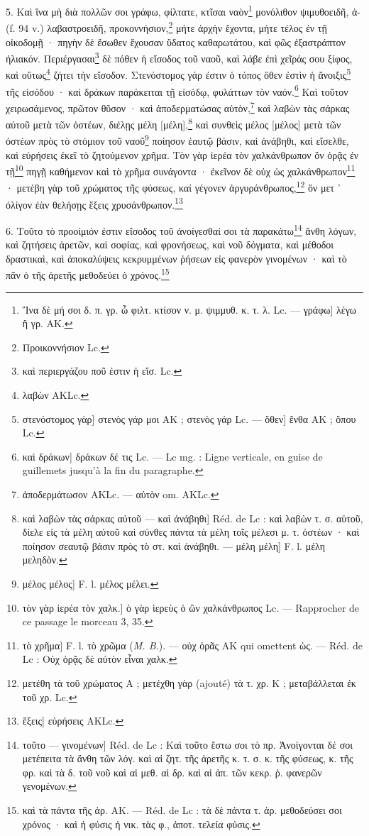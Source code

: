 \documentclass[a4paper, 11pt, oneside, polutonikogreek, french]{article}
\begin{document}
5. Καὶ ἵνα μὴ διὰ πολλῶν σοι γράφω, φίλτατε, κτῖσαι ναὸν\footnote{Ἵνα δὲ μή σοι δ. π. γρ. ὦ φιλτ. κτίσον ν. μ. ψιμμυθ. κ. τ. λ. Lc. --- γράφω] λέγω ἢ γρ. AK.} μονόλιθον ψιμυθοειδῆ, ἀ- (f. 94 v.) λαβαστροειδῆ, προκοννήσιον,\footnote{Προικοννήσιον Lc.} μήτε ἀρχὴν ἔχοντα, μήτε τέλος ἐν τῇ οἰκοδομῇ · πηγὴν δὲ ἔσωθεν ἔχουσαν ὕδατος καθαρωτάτου, καὶ φῶς ἐξαστράπτον ἡλιακόν. Περιέργασαι\footnote{καὶ περιεργάζου ποῦ ἐστιν ἡ εἴσ. Lc.} δὲ πόθεν ἡ εἴσοδος τοῦ ναοῦ, καὶ λάβε ἐπὶ χεῖράς σου ξίφος, καὶ οὕτως\footnote{λαβὼν AKLc.} ζήτει τὴν εἴσοδον. Στενόστομος γάρ ἐστιν ὁ τόπος ὅθεν ἐστὶν ἡ ἄνοιξις\footnote{στενόστομος γὰρ] στενὸς γάρ μοι AK ; στενὸς γάρ Lc. --- ὅθεν] ἔνθα AK ; ὅπου Lc.} τῆς εἰσόδου · καὶ δράκων παράκειται τῇ εἰσόδῳ, φυλάττων τὸν ναόν.\footnote{καὶ δράκων] δράκων δέ τις Lc. --- Lc mg. : Ligne verticale, en guise de guillemets jusqu'à la fin du paragraphe.} Καὶ τοῦτον χειρωσάμενος, πρῶτον θῦσον · καὶ ἀποδερματώσας αὐτὸν,\footnote{ἀποδερμάτωσον AKLc. --- αὐτὸν om. AKLc.} καὶ λαβὼν τὰς σάρκας αὐτοῦ μετὰ τῶν ὀστέων, διέλῃς μέλη [μέλη],\footnote{καὶ λαβὼν τὰς σάρκας αὐτοῦ --- καὶ ἀνάβηθι] Réd. de Lc : καὶ λαβὼν τ. σ. αὐτοῦ, δίελε εἰς τὰ μέλη αὐτοῦ καὶ σύνθες πάντα τὰ μέλη τοῖς μέλεσι μ. τ. ὀστέων · καὶ ποίησον σεαυτῷ βάσιν πρὸς τὸ στ. καὶ ἀνάβηθι. --- μέλη μέλη] F. l. μέλη μεληδὸν.} καὶ συνθεὶς μέλος [μέλος] μετὰ τῶν ὀστέων πρὸς τὸ στόμιον τοῦ ναοῦ\footnote{μέλος μέλος] F. l. μέλος μέλει.} ποίησον ἑαυτῷ βάσιν, καὶ ἀνάβηθι, καὶ εἴσελθε, καὶ εὑρήσεις ἐκεῖ τὸ ζητούμενον χρῆμα. Τὸν γὰρ ἱερέα τὸν χαλκάνθρωπον ὃν ὁρᾷς ἐν τῇ\footnote{τὸν γὰρ ἱερέα τὸν χαλκ.] ὁ γὰρ ἱερεὺς ὁ ὢν χαλκάνθρωπος Lc. --- Rapprocher de ce passage le morceau 3, 35.} πηγῇ καθήμενον καὶ τὸ χρῆμα συνάγοντα · ἐκεῖνον δὲ οὐχ ὡς χαλκάνθρωπον\footnote{τὸ χρῆμα] F. l. τὸ χρῶμα (\emph{M. B.}). --- οὐχ ὁρᾶς AK qui omettent ὡς. --- Réd. de Lc : Οὐχ ὁρᾷς δὲ αὐτὸν εἶναι χαλκ.} · μετέβη γὰρ τοῦ χρώματος τῆς φύσεως, καί γέγονεν ἀργυράνθρωπος,\footnote{μετέθη τὰ τοῦ χρώματος A ; μετέχθη γὰρ (ajouté) τὰ τ. χρ. K ; μεταβάλλεται ἐκ τοῦ χρ. Lc.} ὅν μετ ᾽ ὀλίγον ἐὰν θελήσῃς ἕξεις χρυσάνθρωπον.\footnote{ἕξεις] εὑρήσεις AKLc.}

6. Τοῦτο τὸ προοίμιόν ἐστιν εἴσοδος τοῦ ἀνοίγεσθαί σοι τὰ παρακάτω\footnote{τοῦτο --- γινομένων] Réd. de Lc : Καὶ τοῦτο ἔστω σοι τὸ πρ. Ἀνοίγονται δέ σοι μετέπειτα τὰ ἄνθη τῶν λόγ. καὶ αἱ ζητ. τῆς ἀρετῆς κ. τ. σ. κ. τῆς φύσεως, κ. τῆς φρ. καὶ τὰ δ. τοῦ νοῦ καὶ αἱ μεθ. αἱ δρ. καὶ αἱ ἀπ. τῶν κεκρ. ῥ. φανερῶν γενομένων.} ἄνθη λόγων, καὶ ζητήσεις ἀρετῶν, καὶ σοφίας, καὶ φρονήσεως, καὶ νοῦ δόγματα, καὶ μέθοδοι δραστικαὶ, καὶ ἀποκαλύψεις κεκρυμμένων ῥήσεων εἰς φανερὸν γινομένων · καὶ τὸ πᾶν ὁ τῆς ἀρετῆς μεθοδεύει ὁ χρόνος.\footnote{καὶ τὰ πάντα τῆς ἀρ. AK. --- Réd. de Lc : τὰ δὲ πάντα τ. ἀρ. μεθοδεύσει σοι χρόνος · καὶ ἡ φύσις ἡ νικ. τὰς φ., ἀποτ. τελεία φύσις.}
\end{document}
